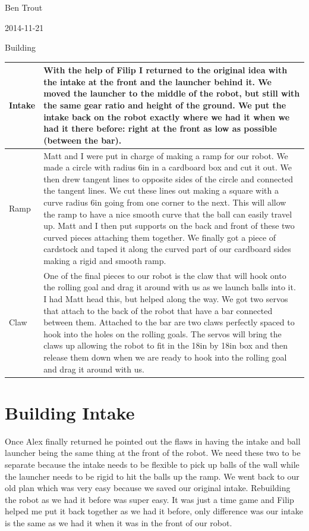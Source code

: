 Ben Trout

2014-11-21

Building  

\begin{tabular}{|p{4cm}|p{6cm}|}
\hline
 Intake&
With the help of Filip I returned to the original idea with the intake at the front and the launcher behind it. We moved the launcher to the middle of the robot, but still with the same gear ratio and height of the ground. We put the intake back on the robot exactly where we had it when we had it there before: right at the front as low as possible (between the bar).
\\
\hline
Ramp&
Matt and I were put in charge of making a ramp for our robot. We made a circle with radius 6in in a cardboard box and cut it out. We then drew tangent lines to opposite sides of the circle and connected the tangent lines. We cut these lines out making a square with a curve radius 6in going from one corner to the next. This will allow the ramp to have a nice smooth curve that the ball can easily travel up. Matt and I then put supports on the back and front of these two curved pieces attaching them together. We finally got a piece of cardstock and taped it along the curved part of our cardboard sides making a rigid and smooth ramp. 
\\
\hline
Claw&
One of the final pieces to our robot is the claw that will hook onto the rolling goal and drag it around with us as we launch balls into it. I had Matt head this, but helped along the way. We got two servos that attach to the back of the robot that have a bar connected between them. Attached to the bar are two claws perfectly spaced to hook into the holes on the rolling goals. The servos will bring the claws up allowing the robot to fit in the 18in by 18in box and then release them down when we are ready to hook into the rolling goal and drag it around with us. 
\\
\hline
\end{tabular}

\section*{Building Intake}
Once Alex finally returned he pointed out the flaws in having the intake and ball launcher being the same thing at the front of the robot. We need these two to be separate because the intake needs to be flexible to pick up balls of the wall while the launcher needs to be rigid to hit the balls up the ramp. We went back to our old plan which was very easy because we saved our original intake. Rebuilding the robot as we had it before was super easy. It was just a time game and Filip helped me put it back together as we had it before, only difference was our intake is the same as we had it when it was in the front of our robot. 

